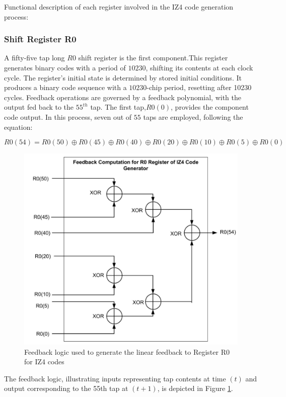 \noindent Functional description of each register involved in the IZ4 code generation process:

\subsubsection{Shift Register R0}

\noindent A fifty-five tap long $R0$ shift register is the first component.This register generates binary codes with a period of $10230$, shifting its contents at each clock cycle. The register's initial state is determined by stored initial conditions. It produces a binary code sequence with a $10230$-chip period, resetting after 10230 cycles. Feedback operations are governed by a feedback polynomial, with the output fed back to the $55^{th}$ tap. The first tap,$ R0(0)$, provides the component code output. In this process, seven out of $55$ taps are employed, following the equation: 

\begin{equation}
R0(54) = R0(50) \oplus R0(45) \oplus R0(40) \oplus R0(20) \oplus R0(10) \oplus R0(5) \oplus R0(0) 
\label{eq:R0(54)} 
\end{equation}

\begin{figure}[ht]
\centering
\includegraphics[width=0.8\columnwidth]{figs/R0_IZ4.png}
\centering
\captionsetup{justification=centering}
\caption{Feedback logic used to generate the linear feedback to Register R0 for IZ4 codes}
\label{fig:R0_IZ4}
\end{figure}
\noindent The feedback logic, illustrating inputs representing tap contents at time $(t)$ and output corresponding to the 55th tap at $(t+1)$, is depicted in Figure \ref{fig:R0_IZ4}.

